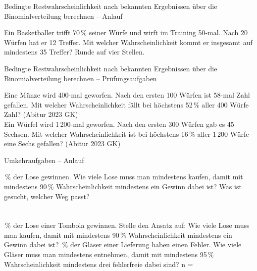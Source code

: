 \begin{aufgabe}{Bedingte Restwahrscheinlichkeit nach bekannten Ergebnissen über die Binomialverteilung berechnen – Anlauf}
\begin{teile}
\teil Ein Basketballer trifft 70\,\% seiner Würfe und wirft im Training 50-mal. Nach 20 Würfen hat er 12 Treffer. Mit welcher Wahrscheinlichkeit kommt er insgesamt auf mindestens 35 Treffer? Runde auf vier Stellen. \leerfeld
\end{teile}
\end{aufgabe}

\begin{aufgabe}{Bedingte Restwahrscheinlichkeit nach bekannten Ergebnissen über die Binomialverteilung berechnen – Prüfungsaufgaben}
\begin{teile}
\teil Eine Münze wird 400-mal geworfen. Nach den ersten 100 Würfen ist 58-mal Zahl gefallen. Mit welcher Wahrscheinlichkeit fällt bei höchstens 52\,\% aller 400 Würfe Zahl? \hfill (Abitur 2023 GK) \\ \leerfeld
\teil Ein Würfel wird 1\,200-mal geworfen. Nach den ersten 300 Würfen gab es 45 Sechsen. Mit welcher Wahrscheinlichkeit ist bei höchstens 16\,\% aller 1\,200 Würfe eine Sechs gefallen? \hfill (Abitur 2023 GK) \\ \leerfeld
\end{teile}
\end{aufgabe}

\begin{aufgabe}{Umkehraufgaben – Anlauf}
\begin{teile}
\,\% der Lose gewinnen. Wie viele Lose muss man mindestens kaufen, damit mit mindestens 90\,\% Wahrscheinlichkeit mindestens ein Gewinn dabei ist? Was ist gesucht, welcher Weg passt?  \\  \\  \\ 
\,\% der Lose einer Tombola gewinnen. Stelle den Ansatz auf: Wie viele Lose muss man kaufen, damit mit mindestens 90\,\% Wahrscheinlichkeit mindestens ein Gewinn dabei ist?
\,\% der Gläser einer Lieferung haben einen Fehler. Wie viele Gläser muss man mindestens entnehmen, damit mit mindestens 95\,\% Wahrscheinlichkeit mindestens drei fehlerfreie dabei sind? n = \leerfeld
\end{teile}
\end{aufgabe}


